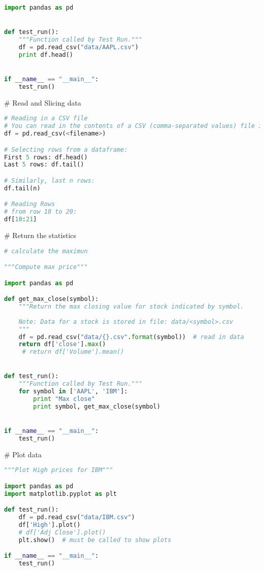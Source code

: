 \documentclass{article}
\begin{document}
\begin{lstlisting}[language=Python]
import pandas as pd


def test_run():
    """Function called by Test Run."""
    df = pd.read_csv("data/AAPL.csv")
    print df.head()


if __name__ == "__main__":
    test_run()
\end{lstlisting}

\# Read and Slicing data
\begin{lstlisting}[language=Python]
# Reading in a CSV file
# You can read in the contents of a CSV (comma-separated values) file into a Pandas dataframe using:
df = pd.read_csv(<filename>)

# Selecting rows from a dataframe:
First 5 rows: df.head()
Last 5 rows: df.tail()

# Similarly, last n rows: 
df.tail(n)

# Reading Rows
# from row 10 to 20:
df[10:21] 
\end{lstlisting}


\# Return the statistics
\begin{lstlisting}[language=Python]
# calculate the maximun

"""Compute max price"""

import pandas as pd

def get_max_close(symbol):
    """Return the max closing value for stock indicated by symbol.
    
    Note: Data for a stock is stored in file: data/<symbol>.csv
    """
    df = pd.read_csv("data/{}.csv".format(symbol))  # read in data
    return df['close'].max()
     # return df['Volume'].mean()


def test_run():
    """Function called by Test Run."""
    for symbol in ['AAPL', 'IBM']:
        print "Max close"
        print symbol, get_max_close(symbol)


if __name__ == "__main__":
    test_run()
\end{lstlisting}

\# Plot data
\begin{lstlisting}[language=Python]
"""Plot High prices for IBM"""

import pandas as pd
import matplotlib.pyplot as plt

def test_run():
    df = pd.read_csv("data/IBM.csv")
    df['High'].plot()
    # df['Adj Close'].plot()
    plt.show()  # must be called to show plots

if __name__ == "__main__":
    test_run()
\end{lstlisting}
\end{document}
